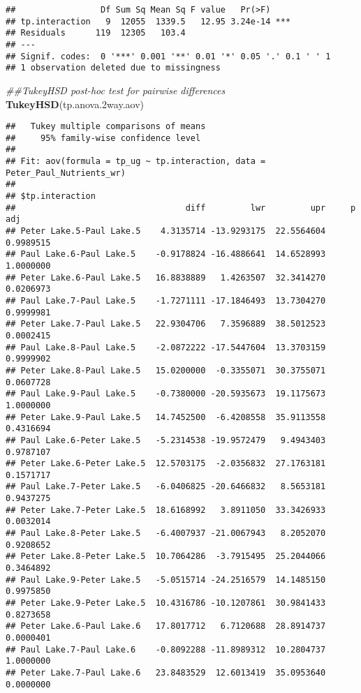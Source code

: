 \documentclass[]{article}
\newenvironment{Shaded}{\begin{snugshade}}{\end{snugshade}}
\newcommand{\CommentTok}[1]{\textcolor[rgb]{0.56,0.35,0.01}{\textit{#1}}}
\newcommand{\FloatTok}[1]{\textcolor[rgb]{0.00,0.00,0.81}{#1}}
\newcommand{\KeywordTok}[1]{\textcolor[rgb]{0.13,0.29,0.53}{\textbf{#1}}}
\newcommand{\NormalTok}[1]{#1}
\begin{document}
\begin{verbatim}
##                 Df Sum Sq Mean Sq F value   Pr(>F)    
## tp.interaction   9  12055  1339.5   12.95 3.24e-14 ***
## Residuals      119  12305   103.4                     
## ---
## Signif. codes:  0 '***' 0.001 '**' 0.01 '*' 0.05 '.' 0.1 ' ' 1
## 1 observation deleted due to missingness
\end{verbatim}

\begin{Shaded}
\begin{Highlighting}[]
\CommentTok{##TukeyHSD post-hoc test for pairwise differences}
\KeywordTok{TukeyHSD}\NormalTok{(tp.anova}\FloatTok{.2}\NormalTok{way.aov)}
\end{Highlighting}
\end{Shaded}

\begin{verbatim}
##   Tukey multiple comparisons of means
##     95% family-wise confidence level
## 
## Fit: aov(formula = tp_ug ~ tp.interaction, data = Peter_Paul_Nutrients_wr)
## 
## $tp.interaction
##                                  diff         lwr         upr     p adj
## Peter Lake.5-Paul Lake.5    4.3135714 -13.9293175  22.5564604 0.9989515
## Paul Lake.6-Paul Lake.5    -0.9178824 -16.4886641  14.6528993 1.0000000
## Peter Lake.6-Paul Lake.5   16.8838889   1.4263507  32.3414270 0.0206973
## Paul Lake.7-Paul Lake.5    -1.7271111 -17.1846493  13.7304270 0.9999981
## Peter Lake.7-Paul Lake.5   22.9304706   7.3596889  38.5012523 0.0002415
## Paul Lake.8-Paul Lake.5    -2.0872222 -17.5447604  13.3703159 0.9999902
## Peter Lake.8-Paul Lake.5   15.0200000  -0.3355071  30.3755071 0.0607728
## Paul Lake.9-Paul Lake.5    -0.7380000 -20.5935673  19.1175673 1.0000000
## Peter Lake.9-Paul Lake.5   14.7452500  -6.4208558  35.9113558 0.4316694
## Paul Lake.6-Peter Lake.5   -5.2314538 -19.9572479   9.4943403 0.9787107
## Peter Lake.6-Peter Lake.5  12.5703175  -2.0356832  27.1763181 0.1571717
## Paul Lake.7-Peter Lake.5   -6.0406825 -20.6466832   8.5653181 0.9437275
## Peter Lake.7-Peter Lake.5  18.6168992   3.8911050  33.3426933 0.0032014
## Paul Lake.8-Peter Lake.5   -6.4007937 -21.0067943   8.2052070 0.9208652
## Peter Lake.8-Peter Lake.5  10.7064286  -3.7915495  25.2044066 0.3464892
## Paul Lake.9-Peter Lake.5   -5.0515714 -24.2516579  14.1485150 0.9975850
## Peter Lake.9-Peter Lake.5  10.4316786 -10.1207861  30.9841433 0.8273658
## Peter Lake.6-Paul Lake.6   17.8017712   6.7120688  28.8914737 0.0000401
## Paul Lake.7-Paul Lake.6    -0.8092288 -11.8989312  10.2804737 1.0000000
## Peter Lake.7-Paul Lake.6   23.8483529  12.6013419  35.0953640 0.0000000

\end{verbatim}
\end{document}
